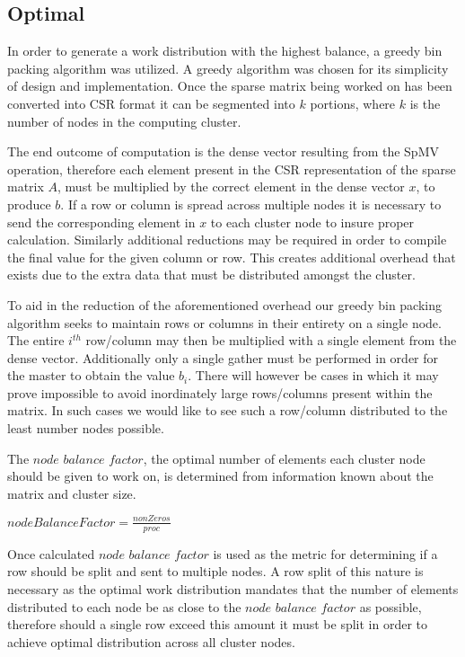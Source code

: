 \subsection{Optimal}\label{sec:dspmv-lb-optimal}

In order to generate a work distribution with the highest balance, a greedy bin packing algorithm was utilized. A greedy algorithm was chosen for its simplicity of design and implementation. Once the sparse matrix being worked on has been converted into CSR format it can be segmented into $k$ portions, where $k$ is the number of nodes in the computing cluster. 

The end outcome of computation is the dense vector resulting from the SpMV operation, therefore each element present in the CSR representation of the sparse matrix $A$, must be multiplied by the correct element in the dense vector $x$, to produce $b$. If a row or column is spread across multiple nodes it is necessary to send the corresponding element in $x$ to each cluster node to insure proper calculation. Similarly additional reductions may be required in order to compile the final value for the given column or row. This creates additional overhead that exists due to the extra data that must be distributed amongst the cluster. 

To aid in the reduction of the aforementioned overhead our greedy bin packing algorithm seeks to maintain rows or columns in their entirety on a single node. The entire $i^{th}$ row/column may then be multiplied with a single element from the dense vector. Additionally only a single gather must be performed in order for the master to obtain the value $b_i$. There will however be cases in which it may prove impossible to avoid inordinately large rows/columns present within the matrix. In such cases we would like to see such a row/column distributed to the least number nodes possible. 

The $node$ $balance$ $factor$, the optimal number of elements each cluster node should be given to work on, is determined from information known about the matrix and cluster size. 

\medskip
\begin{center}
$nodeBalanceFactor = \frac{nonZeros}{proc}$
\end{center}
\medskip

Once calculated $node$ $balance$ $factor$ is used as the metric for determining if a row should be split and sent to multiple nodes. A row split of this nature is necessary as the optimal work distribution mandates that the number of elements distributed to each node be as close to the $node$ $balance$ $factor$ as possible, therefore should a single row exceed this amount it must be split in order to achieve optimal distribution across all cluster nodes. 

